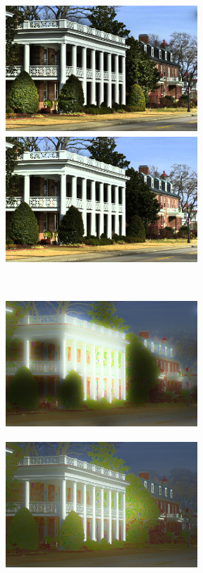 \begin{figure}[htbp]
\centering
	\begin{minipage}[b]{0.49\hsize}
		\centering
		\includegraphics[width=72mm, height=48mm]{images/experiment/decomp/srie/reflectance.eps}
	\end{minipage}
	\begin{minipage}[b]{0.49\hsize}
		\centering
		\includegraphics[width=72mm, height=48mm]{images/experiment/decomp/wvm/reflectance.eps}
	\end{minipage} \\
	\vspace{1.5mm}
	\begin{minipage}[b]{0.49\hsize}
		\centering
		\includegraphics[width=72mm, height=48mm]{images/experiment/decomp/srie/illumination.eps}
		 \label{fig. decomp_srie}
	\end{minipage}
	\begin{minipage}[b]{0.49\hsize}
		\centering
		\includegraphics[width=72mm, height=48mm]{images/experiment/decomp/wvm/illumination.eps}

\end{minipage}
\end{figure}
